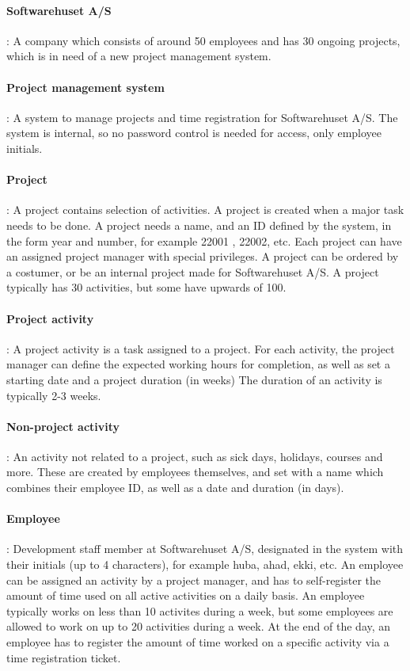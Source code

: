\paragraph{Softwarehuset A/S}: A company which consists of around 50 employees and has 30 ongoing projects, which is in need of a new project management system.
\paragraph{Project management system}: A system to manage projects and time registration for Softwarehuset A/S. The system is internal, so no password control is needed for access, only employee initials.
\paragraph{Project}: A project contains selection of activities. A project is created when a major task needs to be done. A project needs a name, and an ID defined by the system, in the form year and number, for example 22001 , 22002, etc. Each project can have an assigned project manager with special privileges. A project can be ordered by a costumer, or be an internal project made for Softwarehuset A/S. A project typically has 30 activities, but some have upwards of 100.
\paragraph{Project activity}: A project activity is a task assigned to a project. For each activity, the project manager can define the expected working hours for completion, as well as set a starting date and a project duration (in weeks) The duration of an activity is typically 2-3 weeks.
\paragraph{Non-project activity}: An activity not related to a project, such as sick days, holidays, courses and more. These are created by employees themselves, and set with a name which combines their employee ID, as well as a date and duration (in days).
\paragraph{Employee}: Development staff member at Softwarehuset A/S, designated in the system with their initials (up to 4 characters), for example huba, ahad, ekki, etc. An employee can be assigned an activity by a project manager, and has to self-register the amount of time used on all active activities on a daily basis. An employee typically works on less than 10 activites during a week, but some employees are allowed to work on up to 20 activities during a week. At the end of the day, an employee has to register the amount of time worked on a specific activity via a time registration ticket. 
